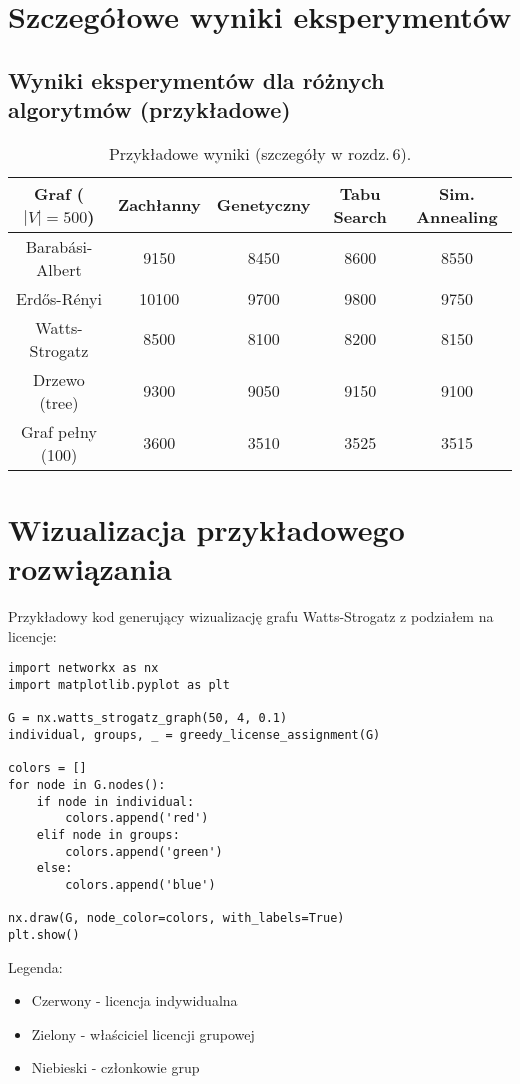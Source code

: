 \section{Szczegółowe wyniki eksperymentów}

\subsection{Wyniki eksperymentów dla różnych algorytmów (przykładowe)}

\begin{table}[h]
\centering
\begin{tabular}{|c|c|c|c|c|}
\hline
\textbf{Graf (\(|V|=500\))} & \textbf{Zachłanny} & \textbf{Genetyczny} & \textbf{Tabu Search} & \textbf{Sim. Annealing} \\
\hline
Barabási-Albert & 9150 & 8450 & 8600 & 8550 \\
Erdős-Rényi & 10100 & 9700 & 9800 & 9750 \\
Watts-Strogatz & 8500 & 8100 & 8200 & 8150 \\
Drzewo (tree) & 9300 & 9050 & 9150 & 9100 \\
Graf pełny (100) & 3600 & 3510 & 3525 & 3515 \\
\hline
\end{tabular}
\caption{Przykładowe wyniki (szczegóły w rozdz.\,6).}
\end{table}

\section{Wizualizacja przykładowego rozwiązania}

Przykładowy kod generujący wizualizację grafu Watts-Strogatz z podziałem na licencje:

\begin{verbatim}
import networkx as nx
import matplotlib.pyplot as plt

G = nx.watts_strogatz_graph(50, 4, 0.1)
individual, groups, _ = greedy_license_assignment(G)

colors = []
for node in G.nodes():
    if node in individual:
        colors.append('red')
    elif node in groups:
        colors.append('green')
    else:
        colors.append('blue')

nx.draw(G, node_color=colors, with_labels=True)
plt.show()
\end{verbatim}

Legenda:
\begin{itemize}
    \item Czerwony - licencja indywidualna
    \item Zielony - właściciel licencji grupowej
    \item Niebieski - członkowie grup
\end{itemize}


